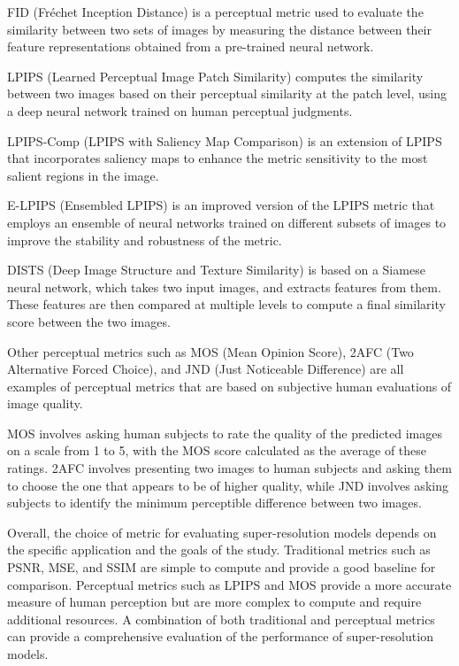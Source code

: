 FID (Fréchet Inception Distance) is a perceptual metric used to evaluate the similarity between two sets of images by measuring the distance between their feature representations obtained from a pre-trained neural network.

LPIPS (Learned Perceptual Image Patch Similarity) computes the similarity between two images based on their perceptual similarity at the patch level, using a deep neural network trained on human perceptual judgments.

LPIPS-Comp (LPIPS with Saliency Map Comparison) is an extension of LPIPS that incorporates saliency maps to enhance the metric sensitivity to the most salient regions in the image.

E-LPIPS (Ensembled LPIPS) is an improved version of the LPIPS metric that employs an ensemble of neural networks trained on different subsets of images to improve the stability and robustness of the metric.

DISTS (Deep Image Structure and Texture Similarity) is based on a Siamese neural network, which takes two input images, and extracts features from them. These features are then compared at multiple levels to compute a final similarity score between the two images.

Other perceptual metrics such as MOS (Mean Opinion Score), 2AFC (Two Alternative Forced Choice), and JND (Just Noticeable Difference) are all examples of perceptual metrics that are based on subjective human evaluations of image quality.

MOS involves asking human subjects to rate the quality of the predicted images on a scale from 1 to 5, with the MOS score calculated as the average of these ratings. 2AFC involves presenting two images to human subjects and asking them to choose the one that appears to be of higher quality, while JND involves asking subjects to identify the minimum perceptible difference between two images.

Overall, the choice of metric for evaluating super-resolution models depends on the specific application and the goals of the study. Traditional metrics such as PSNR, MSE, and SSIM are simple to compute and provide a good baseline for comparison. Perceptual metrics such as LPIPS and MOS provide a more accurate measure of human perception but are more complex to compute and require additional resources. A combination of both traditional and perceptual metrics can provide a comprehensive evaluation of the performance of super-resolution models.


